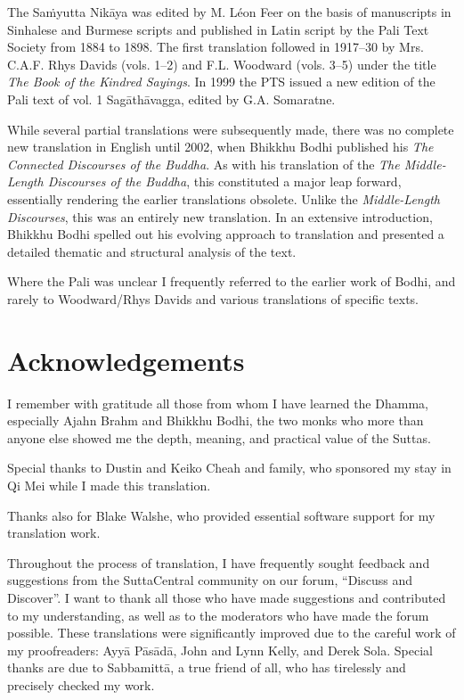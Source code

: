 \documentclass[12pt,openany]{book}%
\begin{document}
The \textsanskrit{Saṁyutta} \textsanskrit{Nikāya} was edited by M. Léon Feer on the basis of manuscripts in Sinhalese and Burmese scripts and published in Latin script by the Pali Text Society from 1884 to 1898. The first translation followed in 1917–30 by Mrs. C.A.F. Rhys Davids (vols. 1–2) and F.L. Woodward (vols. 3–5) under the title \textit{The Book of the Kindred Sayings}. In 1999 the PTS issued a new edition of the Pali text of vol. 1 \textsanskrit{Sagāthāvagga}, edited by G.A. Somaratne.

While several partial translations were subsequently made, there was no complete new translation in English until 2002, when Bhikkhu Bodhi published his \textit{The Connected Discourses of the Buddha}. As with his translation of the \textit{The Middle-Length Discourses of the Buddha}, this constituted a major leap forward, essentially rendering the earlier translations obsolete. Unlike the \textit{Middle-Length Discourses}, this was an entirely new translation. In an extensive introduction, Bhikkhu Bodhi spelled out his evolving approach to translation and presented a detailed thematic and structural analysis of the text.

Where the Pali was unclear I frequently referred to the earlier work of Bodhi, and rarely to Woodward/Rhys Davids and various translations of specific texts.

%
\chapter*{Acknowledgements}

I remember with gratitude all those from whom I have learned the Dhamma, especially Ajahn Brahm and Bhikkhu Bodhi, the two monks who more than anyone else showed me the depth, meaning, and practical value of the Suttas.

Special thanks to Dustin and Keiko Cheah and family, who sponsored my stay in Qi Mei while I made this translation.

Thanks also for Blake Walshe, who provided essential software support for my translation work.

Throughout the process of translation, I have frequently sought feedback and suggestions from the SuttaCentral community on our forum, “Discuss and Discover”. I want to thank all those who have made suggestions and contributed to my understanding, as well as to the moderators who have made the forum possible. These translations were significantly improved due to the careful work of my proofreaders: \textsanskrit{Ayyā} \textsanskrit{Pāsādā}, John and Lynn Kelly, and Derek Sola. Special thanks are due to \textsanskrit{Sabbamittā}, a true friend of all, who has tirelessly and precisely checked my work.
\end{document}

